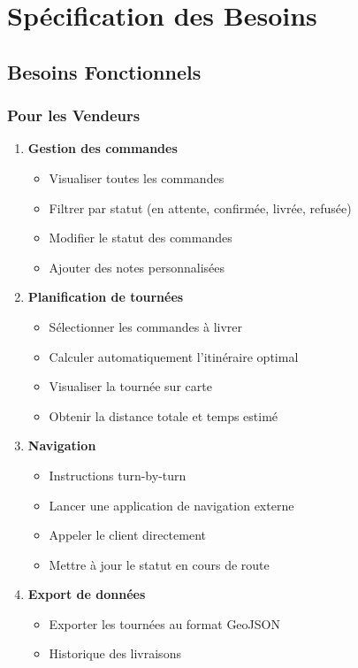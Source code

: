 \documentclass[12pt,a4paper]{report}
\begin{document}
\section{Spécification des Besoins}

\subsection{Besoins Fonctionnels}

\subsubsection{Pour les Vendeurs}

\begin{enumerate}
    \item \textbf{Gestion des commandes}
    \begin{itemize}
        \item Visualiser toutes les commandes
        \item Filtrer par statut (en attente, confirmée, livrée, refusée)
        \item Modifier le statut des commandes
        \item Ajouter des notes personnalisées
    \end{itemize}

    \item \textbf{Planification de tournées}
    \begin{itemize}
        \item Sélectionner les commandes à livrer
        \item Calculer automatiquement l'itinéraire optimal
        \item Visualiser la tournée sur carte
        \item Obtenir la distance totale et temps estimé
    \end{itemize}

    \item \textbf{Navigation}
    \begin{itemize}
        \item Instructions turn-by-turn
        \item Lancer une application de navigation externe
        \item Appeler le client directement
        \item Mettre à jour le statut en cours de route
    \end{itemize}

    \item \textbf{Export de données}
    \begin{itemize}
        \item Exporter les tournées au format GeoJSON
        \item Historique des livraisons
    \end{itemize}
\end{enumerate}
\end{document}
